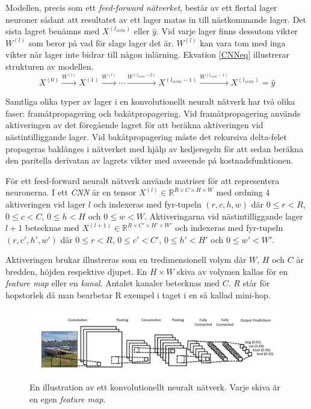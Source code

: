 \documentclass[a4paper,11pt,twoside]{article}
\begin{document}
Modellen, precis som ett \textit{feed-forward nätverket}, består av ett flertal lager neuroner sådant att resultatet av ett lager matas in till nästkommande lager. Det sista lagret benämns med $X^{(l_{sista})}$ eller $\hat{y}$. Vid varje lager finns dessutom vikter $W^{(l)}$  som beror på vad för slags lager det är. $W^{(l)}$ kan vara tom med inga vikter när lager inte bidrar till någon inlärning. Ekvation \eqref{CNNeq} illustrerar strukturen av modellen.\cite{cs231n} \cite{convmath}
\begin{equation}\label{CNNeq}
X^{(0)} \xrightarrow{W^{(l)}} X^{(1)}  \xrightarrow{W^{(l)}} \cdots  \xrightarrow{W^{(l_{sista}-2)}} X^{(l_{sista}-1)}  \xrightarrow{W^{(l_{sista}-1)}} X^{(l_{sista})} = \hat{y}
\end{equation}

Samtliga olika typer av lager i en konvolutionellt neuralt nätverk har två olika faser: framåtpropagering och bakåtpropagering. Vid framåtpropagering används aktiveringen av det föregående lagret för att beräkna aktiveringen vid nästintilliggande lager. Vid bakåtpropagering måste det rekursiva delta-felet propageras baklänges i nätverket med hjälp av kedjeregeln för att sedan beräkna den paritella derivatan av lagrets vikter med avseende på kostnadsfunktionen. \cite{cs231n}

För ett feed-forward neuralt nätverk används matriser för att representera neuronerna. I ett \textit{CNN} är en tensor $X^{(l)} \in \mathbb{R}^{R \times C  \times H \times W}$ med ordning 4 aktiveringen vid lager $l$ och indexeras med fyr-tupeln $(r,c,h,w)$ där $0 \leq r < R$, $0 \leq c < C$, $0 \leq h < H$ och $0 \leq w < W$. Aktiveringarna vid nästintilliggande lager $l+1$ betecknas med $X^{(l+1)} \in \mathbb{R}^{R \times C' \times H' \times W'}$ och indexeras med fyr-tupeln $(r,c',h',w')$ där $0 \leq r < R$, $0 \leq c' < C'$, $0 \leq h' < H'$ och $0 \leq w' < W'$. \cite{cs231n} \cite{convmath}








Aktiveringen brukar illustreras som en tredimensionell volym där $W$, $H$ och $C$ är bredden, höjden respektive djupet. En $H \times W$ skiva av volymen kallas för en \textit{feature map} eller en \textit{kanal}. Antalet kanaler betecknas med $C$. $R$ står för hopstorlek då man bearbetar R exempel i taget i en så kallad mini-hop. \cite{cs231n} \cite{convmath}

\begin{figure}[h]\label{figboatcnn}
	\centering
  		\includegraphics[scale=0.6]{boatcnn.png}
  	\caption{En illustration av ett konvolutionellt neuralt nätverk. Varje skiva är en egen \textit{feature map}. \cite{figboatcnn}}
\end{figure}
\end{document}
